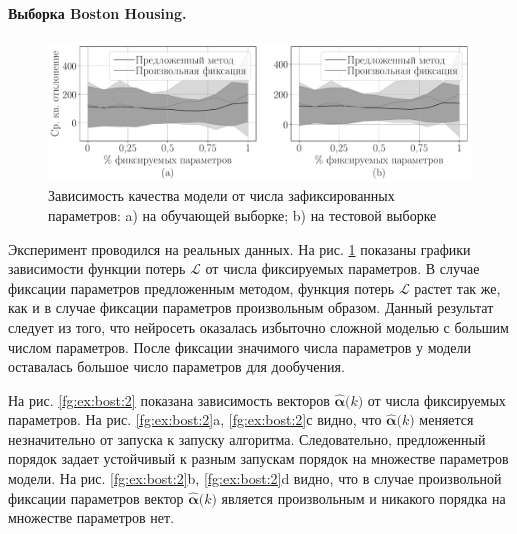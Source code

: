 \paragraph{Выборка Boston Housing.}
\begin{figure}[h!t]\center
\includegraphics[width=1\textwidth]{results/order/boston_data_loss}
\caption{Зависимость качества модели от числа зафиксированных параметров: a) на обучающей выборке; b) на тестовой выборке}
\label{fg:ex:bost:1}
\end{figure}
Эксперимент проводился на реальных данных.
На рис. \ref{fg:ex:bost:1} показаны графики зависимости функции потерь $\mathcal{L}$ от числа фиксируемых параметров. В случае фиксации параметров предложенным методом, функция потерь $\mathcal{L}$ растет так же, как и в случае фиксации параметров произвольным образом.
Данный результат следует из того, что нейросеть оказалась избыточно сложной моделью с большим числом параметров. После фиксации значимого числа параметров у модели оставалась большое число параметров для дообучения.

На рис. \ref{fg:ex:bost:2} показана зависимость векторов $\hat{\bm{\alpha}}\bigr(k\bigr)$ от числа фиксируемых параметров. На рис. \ref{fg:ex:bost:2}a, \ref{fg:ex:bost:2}с видно, что $\hat{\bm{\alpha}}\bigr(k\bigr)$ меняется незначительно от запуска к запуску алгоритма. Следовательно, предложенный порядок задает устойчивый к разным запускам порядок на множестве параметров модели. На рис. \ref{fg:ex:bost:2}b, \ref{fg:ex:bost:2}d видно, что в случае произвольной фиксации параметров вектор $\hat{\bm{\alpha}}\bigr(k\bigr)$ является произвольным и никакого порядка на множестве параметров нет.

